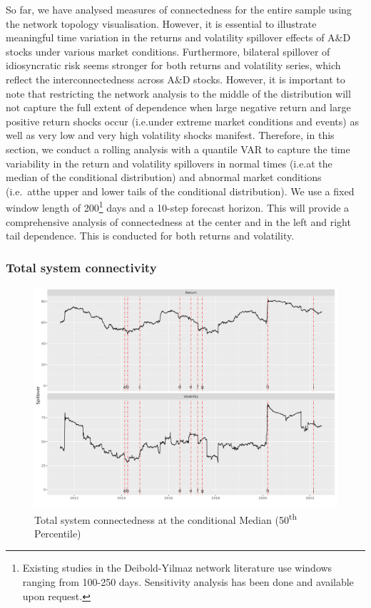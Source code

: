 \documentclass[
  letterpaper,
  DIV=11,
  numbers=noendperiod]{scrartcl}
\begin{document}
So far, we have analysed measures of connectedness for the entire sample
using the network topology visualisation. However, it is essential to
illustrate meaningful time variation in the returns and volatility
spillover effects of A\&D stocks under various market conditions.
Furthermore, bilateral spillover of idiosyncratic risk seems stronger
for both returns and volatility series, which reflect the
interconnectedness across A\&D stocks. However, it is important to note
that restricting the network analysis to the middle of the distribution
will not capture the full extent of dependence when large negative
return and large positive return shocks occur (i.e.under extreme market
conditions and events) as well as very low and very high volatility
shocks manifest. Therefore, in this section, we conduct a rolling
analysis with a quantile VAR to capture the time variability in the
return and volatility spillovers in normal times (i.e.at the median of
the conditional distribution) and abnormal market conditions (i.e.~atthe
upper and lower tails of the conditional distribution). We use a fixed
window length of 200\footnote{Existing studies in the Deibold-Yilmaz
  network literature use windows ranging from 100-250 days. Sensitivity
  analysis has been done and available upon request.} days and a 10-step
forecast horizon. This will provide a comprehensive analysis of
connectedness at the center and in the left and right tail dependence.
This is conducted for both returns and volatility.

\hypertarget{total-system-connectivity}{%
\subsubsection{Total system
connectivity}\label{total-system-connectivity}}

\begin{figure}[H]

{\centering \includegraphics{plots/fig-TCI50.png}

}

\caption{\label{fig-TCI50}Total system connectedness at the conditional
Median (50\textsuperscript{th} Percentile)}

\end{figure}
\end{document}
